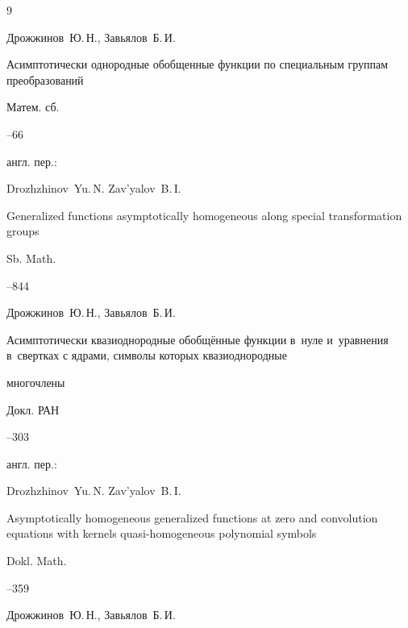 \begin{thebibliography}{9}


\by  Дрожжинов~Ю.\,Н., Завьялов~Б.\,И.

\paper Асимптотически однородные обобщенные функции по специальным группам преобразований

\jour Матем. сб.




--66

\transl англ. пер.:~

\by Drozhzhinov~Yu.\,N. Zav'yalov~B.\,I.

\paper Generalized functions asymptotically homogeneous along special transformation groups

\jour Sb. Math.




--844




\by Дрожжинов~Ю.\,Н., Завьялов~Б.\,И.

\paper Асимптотически квазиоднородные обобщённые функции в~нуле и~уравнения в~свертках с ядрами, символы которых квазиоднородные

многочлены

\jour Докл. РАН  




--303

\transl англ. пер.:~

\by Drozhzhinov~Yu.\,N. Zav'yalov~B.\,I.

\paper Asymptotically homogeneous generalized functions at zero and convolution equations with kernels quasi-homogeneous polynomial symbols

\jour Dokl. Math. 



--359





\by Дрожжинов~Ю.\,Н., Завьялов~Б.\,И.


\end{thebibliography}
